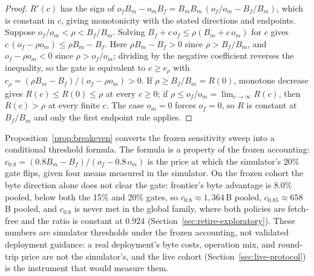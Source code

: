 \begin{proof}
$R'(c)$ has the sign of $o_f B_m-o_m B_f=B_mB_m\,(o_f/o_m-B_f/B_m)$,
which is constant in $c$, giving monotonicity with the stated
directions and endpoints. Suppose $o_f/o_m<\rho<B_f/B_m$. Solving
$B_f+c\,o_f\le\rho(B_m+c\,o_m)$ for $c$ gives
$c\,(o_f-\rho o_m)\le\rho B_m-B_f$. Here
$\rho B_m-B_f>0$ since $\rho>B_f/B_m$, and $o_f-\rho o_m<0$ since
$\rho>o_f/o_m$; dividing by the negative coefficient reverses the
inequality, so the gate is equivalent to $c\ge c_\rho$ with
$c_\rho=(\rho B_m-B_f)/(o_f-\rho o_m)>0$. If $\rho\ge B_f/B_m=R(0)$,
monotone decrease gives $R(c)\le R(0)\le\rho$ at every $c\ge0$; if
$\rho\le o_f/o_m=\lim_{c\to\infty}R(c)$, then $R(c)>\rho$ at every
finite $c$. The case $o_m=0$ forces $o_f=0$, so $R$ is constant at
$B_f/B_m$ and only the first endpoint rule applies.
\end{proof}

\begin{remark}
Proposition~\ref{prop:breakeven} converts the frozen sensitivity sweep
into a conditional threshold formula. The formula is a property of the
frozen accounting: $c_{0.8}=(0.8B_m-B_f)/(o_f-0.8\,o_m)$ is the price
at which the simulator's 20\% gate flips, given four means measured in
the simulator. On the frozen cohort the byte direction alone does not
clear the gate: frontier's byte advantage is $8.0\%$ pooled, below
both the 15\% and 20\% gates, so $c_{0.8}\approx1{,}364$\,B pooled,
$c_{0.85}\approx658$\,B pooled, and $c_{0.8}$ is never met in the
global family, where both policies are fetch-free and the ratio is
constant at $0.924$ (Section~\ref{sec:retire-exploratory}). These
numbers are simulator thresholds under the frozen accounting, not
validated deployment guidance: a real deployment's byte costs,
operation mix, and round-trip price are not the simulator's, and the
live cohort (Section~\ref{sec:live-protocol}) is the instrument that
would measure them.
\end{remark}
